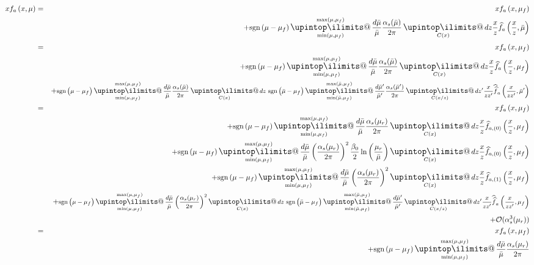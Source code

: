 \documentclass[a4paper,11pt]{article}
\makeatletter
\newcommand{\mksmall}[1]{\textnormal{\smaller$#1$}}
\newcommand{\sgn}[2]{\mathrm{sgn}\left(#1-#2\right)}
\newcommand{\xfhathat}[3]{#2 \widehat{\widehat{f}}_{#1}\left(#2, #3\right)}
\newcommand{\xfhat}[3]{#2 \widehat{f}_{#1}\left(#2, #3\right)}
\newcommand{\xf}[3]{#2 f_{#1}\left(#2, #3\right)}
\newcommand{\upint}{\DOTSI\upintop\ilimits@}
\renewcommand{\int}{\mathop{\mathlarger{\upint}}}
\makeatother
\begin{document}
\begin{eqnarray*}
\xf{a}{x}{\mu} 
&=&
\xf{a}{x}{\mu_f}
\\&&
+
\sgn{\mu}{\mu_f}
\int\displaylimits_{\min(\mu,\mu_f) }^{\max(\mu,\mu_f)}\frac{d\bar\mu}{\bar\mu} \frac{\alpha_s(\bar\mu)}{2\pi}
\int\displaylimits_{C(x)}  dz \xfhat{a}{\frac{x}{z}}{\bar\mu} 
\\&=&
\xf{a}{x}{\mu_f}
\\&&
+
\sgn{\mu}{\mu_f}
\int\displaylimits_{\min(\mu,\mu_f) }^{\max(\mu,\mu_f)}\frac{d\bar\mu}{\bar\mu} \frac{\alpha_s(\bar\mu)}{2\pi}
\int\displaylimits_{C(x)}  dz \xfhat{a}{\frac{x}{z}}{\mu_f} 
\\&&
+
\mksmall{\sgn{\mu}{\mu_f}
\int\displaylimits_{\min(\mu,\mu_f) }^{\max(\mu,\mu_f)}\frac{d\bar\mu}{\bar\mu} \frac{\alpha_s(\bar\mu)}{2\pi}
\int\displaylimits_{C(x)}  dz 
~\sgn{\bar\mu}{\mu_f}
\int\displaylimits_{\min(\bar\mu,\mu_f) }^{\max(\bar\mu,\mu_f)}\frac{d\bar\mu'}{\bar\mu'} \frac{\alpha_s(\bar\mu')}{2\pi}
\int\displaylimits_{C(x/z)}  dz'
\xfhathat{a}{\frac{x}{zz'}}{\bar\mu'} }
\\&=&
\xf{a}{x}{\mu_f}
\\&&
+
\sgn{\mu}{\mu_f}
\int\displaylimits_{\min(\mu,\mu_f) }^{\max(\mu,\mu_f)}\frac{d\bar\mu}{\bar\mu} \frac{\alpha_s(\mu_r)}{2\pi}
\int\displaylimits_{C(x)}  dz \xfhat{a,(0)}{\frac{x}{z}}{\mu_f} 
\\&&
+
\sgn{\mu}{\mu_f}
\int\displaylimits_{\min(\mu,\mu_f) }^{\max(\mu,\mu_f)}\frac{d\bar\mu}{\bar\mu} \left(\frac{\alpha_s(\mu_r)}{2\pi}\right)^2\frac{\beta_0}{2}\ln\left(\frac{\mu_r}{\bar\mu}\right)
\int\displaylimits_{C(x)}  dz \xfhat{a,(0)}{\frac{x}{z}}{\mu_f} 
\\&&
+
\sgn{\mu}{\mu_f}
\int\displaylimits_{\min(\mu,\mu_f) }^{\max(\mu,\mu_f)}\frac{d\bar\mu}{\bar\mu} \left(\frac{\alpha_s(\mu_r)}{2\pi}\right)^2
\int\displaylimits_{C(x)}  dz \xfhat{a,(1)}{\frac{x}{z}}{\mu_f}
\\&&
+
\mksmall{\sgn{\mu}{\mu_f}
\int\displaylimits_{\min(\mu,\mu_f) }^{\max(\mu,\mu_f)}\frac{d\bar\mu}{\bar\mu} \left(\frac{\alpha_s(\mu_r)}{2\pi}\right)^2
\int\displaylimits_{C(x)}  dz 
~\sgn{\bar\mu}{\mu_f}
\int\displaylimits_{\min(\bar\mu,\mu_f) }^{\max(\bar\mu,\mu_f)}\frac{d\bar\mu'}{\bar\mu'}
\int\displaylimits_{C(x/z)}  dz'
\xfhathat{a}{\frac{x}{zz'}}{\mu_f} }
\\&&
+
\mathcal{O}(\alpha_s^3(\mu_r))
%
%
%
%
%
%
\\&=&
\xf{a}{x}{\mu_f}
\\&&
+
\sgn{\mu}{\mu_f}
\int\displaylimits_{\min(\mu,\mu_f) }^{\max(\mu,\mu_f)}\frac{d\bar\mu}{\bar\mu} \frac{\alpha_s(\mu_r)}{2\pi}

\end{eqnarray*}
\end{document}

